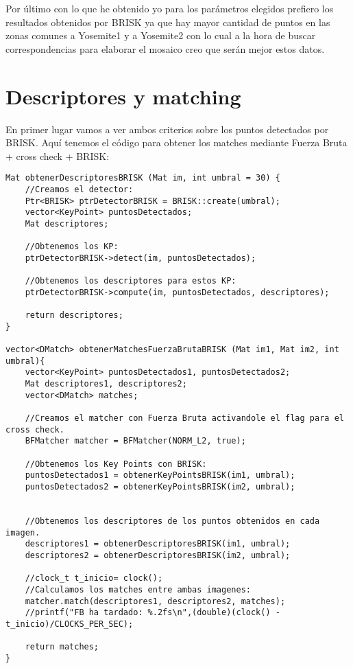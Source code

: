\documentclass[10pt,a4paper]{article}
\begin{document}
Por último con lo que he obtenido yo para los parámetros elegidos prefiero los resultados obtenidos por BRISK ya que hay mayor cantidad de puntos en las zonas comunes a Yosemite1 y a Yosemite2 con lo cual a la hora de buscar correspondencias para elaborar el mosaico creo que serán mejor estos datos.\\

\newpage
\section{Descriptores y matching}

En primer lugar vamos a ver ambos criterios sobre los puntos detectados por BRISK. Aquí tenemos el código para obtener los matches mediante Fuerza Bruta + cross check + BRISK:\\

\begin{lstlisting}
Mat obtenerDescriptoresBRISK (Mat im, int umbral = 30) {
	//Creamos el detector:
	Ptr<BRISK> ptrDetectorBRISK = BRISK::create(umbral);
	vector<KeyPoint> puntosDetectados;
	Mat descriptores;
	
	//Obtenemos los KP:
	ptrDetectorBRISK->detect(im, puntosDetectados);
	
	//Obtenemos los descriptores para estos KP:
	ptrDetectorBRISK->compute(im, puntosDetectados, descriptores);
	
	return descriptores;
}

vector<DMatch> obtenerMatchesFuerzaBrutaBRISK (Mat im1, Mat im2, int umbral){
	vector<KeyPoint> puntosDetectados1, puntosDetectados2;
	Mat descriptores1, descriptores2;
	vector<DMatch> matches;
	
	//Creamos el matcher con Fuerza Bruta activandole el flag para el cross check.
	BFMatcher matcher = BFMatcher(NORM_L2, true);
	
	//Obtenemos los Key Points con BRISK:
	puntosDetectados1 = obtenerKeyPointsBRISK(im1, umbral);
	puntosDetectados2 = obtenerKeyPointsBRISK(im2, umbral);
	
	
	//Obtenemos los descriptores de los puntos obtenidos en cada imagen.
	descriptores1 = obtenerDescriptoresBRISK(im1, umbral);
	descriptores2 = obtenerDescriptoresBRISK(im2, umbral);
	
	//clock_t t_inicio= clock();
	//Calculamos los matches entre ambas imagenes:
	matcher.match(descriptores1, descriptores2, matches);		
	//printf("FB ha tardado: %.2fs\n",(double)(clock() - t_inicio)/CLOCKS_PER_SEC);
	
	return matches;
}
\end{lstlisting}
\end{document}
